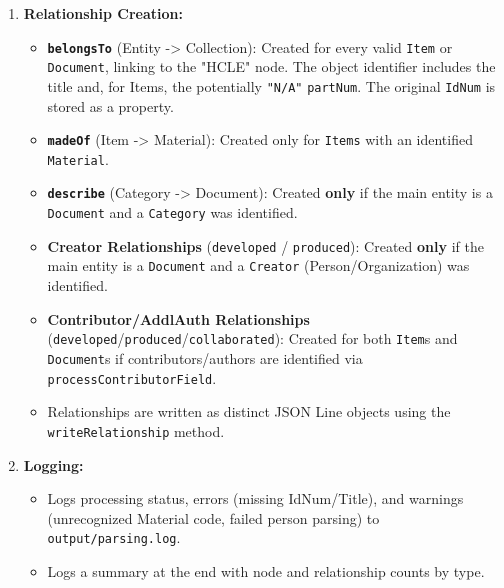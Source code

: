 \documentclass[11pt, a4paper]{article}
\begin{document}
\begin{enumerate}
    \item \textbf{Relationship Creation:}
        \begin{itemize}
            \item \textbf{\texttt{belongsTo}} (Entity -> Collection): Created for every valid \texttt{Item} or \texttt{Document}, linking to the "HCLE" node. The object identifier includes the title and, for Items, the potentially \texttt{"N/A"} \texttt{partNum}. The original \texttt{IdNum} is stored as a property.
            \item \textbf{\texttt{madeOf}} (Item -> Material): Created only for \texttt{Items} with an identified \texttt{Material}.
            \item \textbf{\texttt{describe}} (Category -> Document): Created \textbf{only} if the main entity is a \texttt{Document} and a \texttt{Category} was identified.
            \item \textbf{Creator Relationships} (\texttt{developed} / \texttt{produced}): Created \textbf{only} if the main entity is a \texttt{Document} and a \texttt{Creator} (Person/Organization) was identified.
            \item \textbf{Contributor/AddlAuth Relationships} (\texttt{developed}/\texttt{produced}/\texttt{collaborated}): Created for both \texttt{Item}s and \texttt{Document}s if contributors/authors are identified via \\
            \texttt{processContributorField}.
            \item Relationships are written as distinct JSON Line objects using the \texttt{writeRelationship} method.
        \end{itemize}

    \item \textbf{Logging:}
        \begin{itemize}
            \item Logs processing status, errors (missing IdNum/Title), and warnings (unrecognized Material code, failed person parsing) to \texttt{output/parsing.log}.
            \item Logs a summary at the end with node and relationship counts by type.
        \end{itemize}


\end{enumerate}
\end{document}
